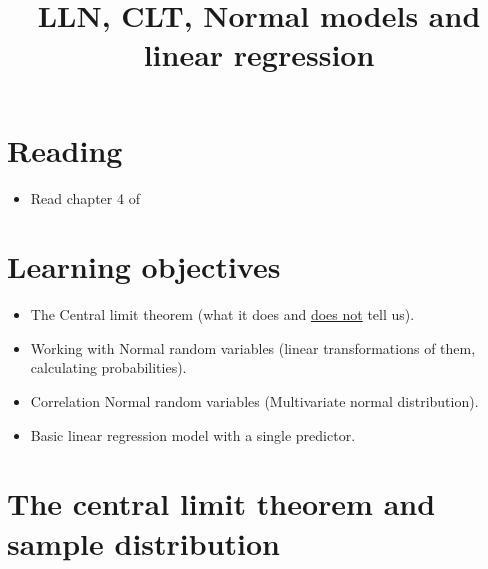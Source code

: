 


\title{LLN, CLT, Normal models and linear regression}

\maketitle
\tableofcontents

\section{Reading}
\begin{itemize}
\item Read chapter 4 of \cite{tabak}
\end{itemize}

\section{Learning objectives}

\begin{itemize}
\item The Central limit theorem (what it does and \underline{does not} tell us).
\item Working with Normal random variables (linear transformations of them, calculating probabilities). 
\item Correlation Normal random variables (Multivariate normal distribution). 
\item Basic linear regression model with a single predictor. 
\end{itemize}

\newif\ifhideproofs

\ifhideproofs
\usepackage{environ}
\NewEnviron{hide}{}
\let\proof\hide
\let\endproof\endhide
\fi


  
  \section{The central limit theorem and sample distribution}
  

